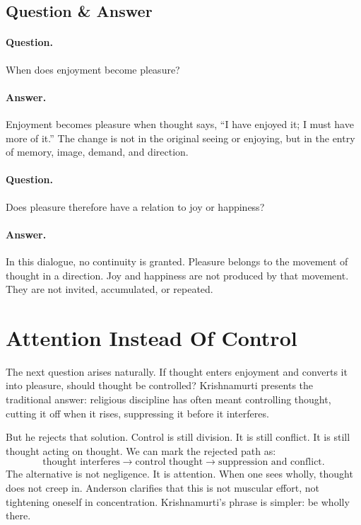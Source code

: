 \subsection{Question \& Answer}

\paragraph{Question.}
When does enjoyment become pleasure?

\paragraph{Answer.}
Enjoyment becomes pleasure when thought says, ``I have enjoyed it; I must have more of it.'' The change is not in the original seeing or enjoying, but in the entry of memory, image, demand, and direction.

\paragraph{Question.}
Does pleasure therefore have a relation to joy or happiness?

\paragraph{Answer.}
In this dialogue, no continuity is granted. Pleasure belongs to the movement of thought in a direction. Joy and happiness are not produced by that movement. They are not invited, accumulated, or repeated.

\section{Attention Instead Of Control}

The next question arises naturally. If thought enters enjoyment and converts it into pleasure, should thought be controlled? Krishnamurti presents the traditional answer: religious discipline has often meant controlling thought, cutting it off when it rises, suppressing it before it interferes.

But he rejects that solution. Control is still division. It is still conflict. It is still thought acting on thought. We can mark the rejected path as:
\begin{equation}
\text{thought interferes}
\longrightarrow
\text{control thought}
\longrightarrow
\text{suppression and conflict}.
\end{equation}
The alternative is not negligence. It is attention. When one sees wholly, thought does not creep in. Anderson clarifies that this is not muscular effort, not tightening oneself in concentration. Krishnamurti's phrase is simpler: be wholly there.

